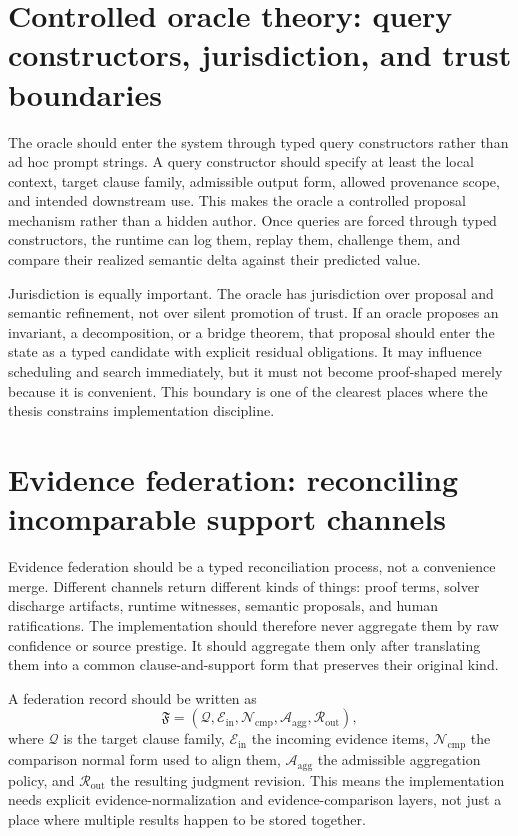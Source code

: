 \documentclass[11pt]{report}
\begin{document}
\section{Controlled oracle theory: query constructors, jurisdiction, and trust boundaries}
The oracle should enter the system through typed query constructors rather than ad hoc prompt strings. A query constructor should specify at least the local context, target clause family, admissible output form, allowed provenance scope, and intended downstream use. This makes the oracle a controlled proposal mechanism rather than a hidden author. Once queries are forced through typed constructors, the runtime can log them, replay them, challenge them, and compare their realized semantic delta against their predicted value.

Jurisdiction is equally important. The oracle has jurisdiction over proposal and semantic refinement, not over silent promotion of trust. If an oracle proposes an invariant, a decomposition, or a bridge theorem, that proposal should enter the state as a typed candidate with explicit residual obligations. It may influence scheduling and search immediately, but it must not become proof-shaped merely because it is convenient. This boundary is one of the clearest places where the thesis constrains implementation discipline.
\section{Evidence federation: reconciling incomparable support channels}
Evidence federation should be a typed reconciliation process, not a convenience merge. Different channels return different kinds of things: proof terms, solver discharge artifacts, runtime witnesses, semantic proposals, and human ratifications. The implementation should therefore never aggregate them by raw confidence or source prestige. It should aggregate them only after translating them into a common clause-and-support form that preserves their original kind.

A federation record should be written as
\[
\mathfrak{F} = (\mathcal{Q}, \mathcal{E}_{\mathrm{in}}, \mathcal{N}_{\mathrm{cmp}}, \mathcal{A}_{\mathrm{agg}}, \mathcal{R}_{\mathrm{out}}),
\]
where $\mathcal{Q}$ is the target clause family, $\mathcal{E}_{\mathrm{in}}$ the incoming evidence items, $\mathcal{N}_{\mathrm{cmp}}$ the comparison normal form used to align them, $\mathcal{A}_{\mathrm{agg}}$ the admissible aggregation policy, and $\mathcal{R}_{\mathrm{out}}$ the resulting judgment revision. This means the implementation needs explicit evidence-normalization and evidence-comparison layers, not just a place where multiple results happen to be stored together.
\end{document}
